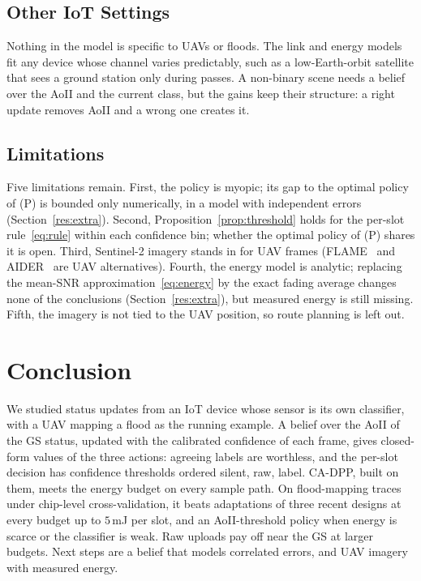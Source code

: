 \documentclass[10pt,journal,compsoc]{IEEEtran}
\theoremstyle{remark}
\begin{document}
\subsection{Other IoT Settings}
Nothing in the model is specific to UAVs or floods. The link and energy models fit any device whose channel varies predictably, such as a low-Earth-orbit satellite that sees a ground station only during passes. A non-binary scene needs a belief over the AoII and the current class, but the gains keep their structure: a right update removes AoII and a wrong one creates it.

\subsection{Limitations}
Five limitations remain. First, the policy is myopic; its gap to the optimal policy of (P) is bounded only numerically, in a model with independent errors (Section~\ref{res:extra}). Second, Proposition~\ref{prop:threshold} holds for the per-slot rule~\eqref{eq:rule} within each confidence bin; whether the optimal policy of (P) shares it is open. Third, Sentinel-2 imagery stands in for UAV frames (FLAME~\cite{shamsoshoara2021flame} and AIDER~\cite{kyrkou2020aider} are UAV alternatives). Fourth, the energy model is analytic; replacing the mean-SNR approximation~\eqref{eq:energy} by the exact fading average changes none of the conclusions (Section~\ref{res:extra}), but measured energy is still missing. Fifth, the imagery is not tied to the UAV position, so route planning is left out.

\section{Conclusion}\label{sec:concl}
We studied status updates from an IoT device whose sensor is its own classifier, with a UAV mapping a flood as the running example. A belief over the AoII of the GS status, updated with the calibrated confidence of each frame, gives closed-form values of the three actions: agreeing labels are worthless, and the per-slot decision has confidence thresholds ordered silent, raw, label. CA-DPP, built on them, meets the energy budget on every sample path. On flood-mapping traces under chip-level cross-validation, it beats adaptations of three recent designs at every budget up to $5$\,mJ per slot, and an AoII-threshold policy when energy is scarce or the classifier is weak. Raw uploads pay off near the GS at larger budgets. Next steps are a belief that models correlated errors, and UAV imagery with measured energy.
\end{document}
